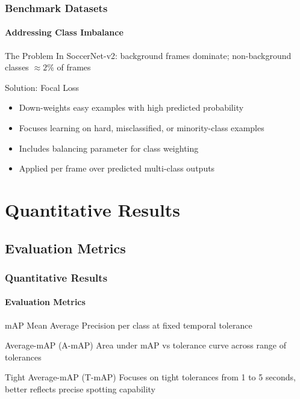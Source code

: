 \documentclass[aspectratio=169, lecture, amberg]{OTHAWbeamer}
\begin{document}
\begin{frame}
\frametitle{Benchmark Datasets}
\framesubtitle{Addressing Class Imbalance}
\begin{block}{The Problem}
In SoccerNet-v2: background frames dominate; non-background classes $\approx 2\%$ of frames
\end{block}

\begin{block}{Solution: Focal Loss}
\begin{itemize}
\item Down-weights easy examples with high predicted probability
\item Focuses learning on hard, misclassified, or minority-class examples
\item Includes balancing parameter for class weighting
\item Applied per frame over predicted multi-class outputs
\end{itemize}
\end{block}
\end{frame}


	\section{Quantitative Results}
\subsection{Evaluation Metrics}

\begin{frame}
\frametitle{Quantitative Results}
\framesubtitle{Evaluation Metrics}
\begin{block}{mAP}
Mean Average Precision per class at fixed temporal tolerance
\end{block}

\begin{block}{Average-mAP (A-mAP)}
Area under mAP vs tolerance curve across range of tolerances
\end{block}

\begin{block}{Tight Average-mAP (T-mAP)}
Focuses on tight tolerances from 1 to 5 seconds, better reflects precise spotting capability
\end{block}
\end{frame}
\end{document}
